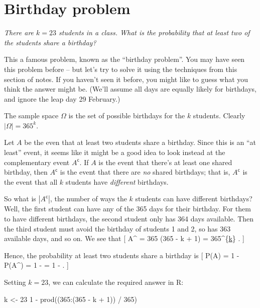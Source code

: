 \documentclass[
  letterpaper,
  DIV=11,
  numbers=noendperiod]{scrreprt}
\newenvironment{Shaded}{\begin{snugshade}}{\end{snugshade}}
\newcommand{\DecValTok}[1]{\textcolor[rgb]{0.68,0.00,0.00}{#1}}
\newcommand{\FunctionTok}[1]{\textcolor[rgb]{0.28,0.35,0.67}{#1}}
\newcommand{\NormalTok}[1]{\textcolor[rgb]{0.00,0.23,0.31}{#1}}
\newcommand{\OtherTok}[1]{\textcolor[rgb]{0.00,0.23,0.31}{#1}}
\newcommand{\SpecialCharTok}[1]{\textcolor[rgb]{0.37,0.37,0.37}{#1}}
\theoremstyle{remark}
\begin{document}
\hypertarget{birthday}{%
\section{Birthday problem}\label{birthday}}

\emph{There are \(k = 23\) students in a class. What is the probability
that at least two of the students share a birthday?}

This a famous problem, known as the ``birthday problem''. You may have
seen this problem before -- but let's try to solve it using the
techniques from this section of notes. If you haven't seen it before,
you might like to guess what you think the answer might be. (We'll
assume all days are equally likely for birthdays, and ignore the leap
day 29 February.)

The sample space \(\Omega\) is the set of possible birthdays for the
\(k\) students. Clearly \(|\Omega| = 365^k\).

Let \(A\) be the even that at least two students share a birthday. Since
this is an ``at least'' event, it seems like it might be a good idea to
look instead at the complementary event \(A^\mathsf{c}\). If \(A\) is
the event that there's at least one shared birthday, then
\(A^\mathsf{c}\) is the event that there are \emph{no} shared birthdays;
that is, \(A^\mathsf{c}\) is the event that all \(k\) students have
\emph{different} birthdays.

So what is \(|A^\mathsf{c}|\), the number of ways the \(k\) students can
have different birthdays? Well, the first student can have any of the
365 days for their birthday. For them to have different birthdays, the
second student only has 364 days available. Then the third student must
avoid the birthday of students 1 and 2, so has 363 available days, and
so on. We see that {[} \textbar A\^{}\textbar{} = 365
 \times \cdots \times (365 - k + 1) = 365\^{}\{\underline{k}\}
. {]}

Hence, the probability at least two students share a birthday is {[}
\mathbb P(A) = 1 - \mathbb P(A\^{}) = 1 -
 = 1 - 
\cdot {} \cdots {} . {]}

Setting \(k = 23\), we can calculate the required answer in R:

\begin{Shaded}
\begin{Highlighting}[]
\NormalTok{k }\OtherTok{\textless{}{-}} \DecValTok{23}
\DecValTok{1} \SpecialCharTok{{-}} \FunctionTok{prod}\NormalTok{((}\DecValTok{365}\SpecialCharTok{:}\NormalTok{(}\DecValTok{365} \SpecialCharTok{{-}}\NormalTok{ k }\SpecialCharTok{+} \DecValTok{1}\NormalTok{)) }\SpecialCharTok{/} \DecValTok{365}\NormalTok{)}
\end{Highlighting}
\end{Shaded}
\end{document}
